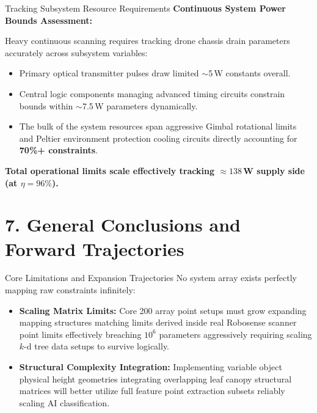 \documentclass[10pt,aspectratio=169]{beamer}
\begin{document}
\begin{frame}{Tracking Subsystem Resource Requirements}
    \textbf{Continuous System Power Bounds Assessment:}
    \vspace{4mm}
    
    Heavy continuous scanning requires tracking drone chassis drain parameters accurately across subsystem variables:
    \begin{itemize}
        \item Primary optical transmitter pulses draw limited $\sim$5\,W constants overall.
        \item Central logic components managing advanced timing circuits constrain bounds within $\sim$7.5\,W parameters dynamically.
        \item The bulk of the system resources span aggressive Gimbal rotational limits and Peltier environment protection cooling circuits directly accounting for \textbf{70\%+ constraints}.
    \end{itemize}
    \textbf{Total operational limits scale effectively tracking $\approx 138$\,W supply side (at $\eta=96\%$).}
\end{frame}

\section{7. General Conclusions and Forward Trajectories}

\begin{frame}{Core Limitations and Expansion Trajectories}
    No system array exists perfectly mapping raw constraints infinitely:
    
    \vspace{4mm}
    \begin{itemize}
        \item \textbf{Scaling Matrix Limits:} Core 200 array point setups must grow expanding mapping structures matching limits derived inside real Robosense scanner point limits effectively breaching $10^6$ parameters aggressively requiring scaling $k$-d tree data setups to survive logically.
        \item \textbf{Structural Complexity Integration:} Implementing variable object physical height geometries integrating overlapping leaf canopy structural matrices will better utilize full feature point extraction subsets reliably scaling AI classification.
    \end{itemize}
\end{frame}
\end{document}
